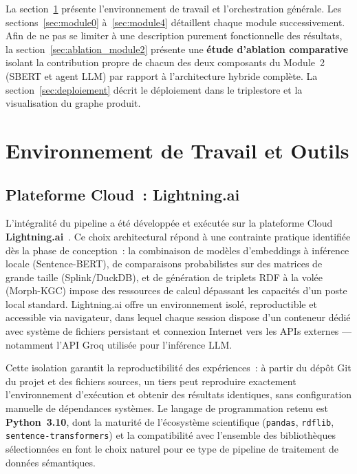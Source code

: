 La section~\ref{sec:env_travail} présente l'environnement de travail
et l'orchestration générale. Les sections~\ref{sec:module0}
à~\ref{sec:module4} détaillent chaque module successivement. Afin de
ne pas se limiter à une description purement fonctionnelle des
résultats, la section~\ref{sec:ablation_module2} présente une
\textbf{étude d'ablation comparative} isolant la contribution propre
de chacun des deux composants du Module~2 (SBERT et agent LLM) par
rapport à l'architecture hybride complète. La
section~\ref{sec:deploiement} décrit le déploiement dans le triplestore
et la visualisation du graphe produit.
\section{Environnement de Travail et Outils}
\label{sec:env_travail}

\subsection{Plateforme Cloud~: Lightning.ai}
\label{subsec:lightning}

L'intégralité du pipeline a été développée et exécutée sur la plateforme
Cloud \textbf{Lightning.ai}~\cite{lightningai2024}. Ce choix architectural
répond à une contrainte pratique identifiée dès la phase de conception~:
la combinaison de modèles d'embeddings à inférence locale
(Sentence-BERT), de comparaisons probabilistes sur des matrices de grande
taille (Splink/DuckDB), et de génération de triplets RDF à la volée
(Morph-KGC) impose des ressources de calcul dépassant les capacités d'un
poste local standard. Lightning.ai offre un environnement isolé,
reproductible et accessible via navigateur, dans lequel chaque session
dispose d'un conteneur dédié avec système de fichiers persistant et
connexion Internet vers les APIs externes --- notamment l'API Groq
utilisée pour l'inférence LLM.

Cette isolation garantit la reproductibilité des expériences~: à partir
du dépôt Git du projet et des fichiers sources, un tiers peut reproduire
exactement l'environnement d'exécution et obtenir des résultats
identiques, sans configuration manuelle de dépendances systèmes. Le
langage de programmation retenu est \textbf{Python~3.10}, dont la
maturité de l'écosystème scientifique (\texttt{pandas}, \texttt{rdflib},
\texttt{sentence-transformers}) et la compatibilité avec l'ensemble des
bibliothèques sélectionnées en font le choix naturel pour ce type de
pipeline de traitement de données sémantiques.

